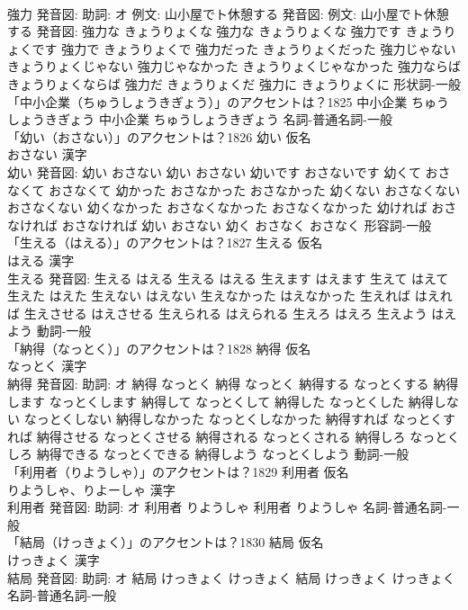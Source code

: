 \documentclass[8pt]{extreport}
\begin{document}
\begin{CJK}{UTF8}{min}
\\	強力 発音図: 助詞: オ 例文: 山小屋でト休憩する 発音図: 例文: 山小屋でト休憩する 発音図:	強力な きょうりょくな		強力な きょうりょくな 強力です きょうりょくです 強力で きょうりょくで 強力だった きょうりょくだった 強力じゃない きょうりょくじゃない 強力じゃなかった きょうりょくじゃなかった 強力ならば きょうりょくならば 強力だ きょうりょくだ 強力に きょうりょくに				形状詞-一般 
\\	「中小企業（ちゅうしょうきぎょう）」のアクセントは？1825		中小企業 ちゅうしょうきぎょう		中小企業 ちゅうしょうきぎょう				名詞-普通名詞-一般 
\\	「幼い（おさない）」のアクセントは？1826	幼い 仮名　
\\	おさない 漢字　
\\	幼い 発音図:	幼い おさない		幼い おさない 幼いです おさないです 幼くて おさなくて おさなくて 幼かった おさなかった おさなかった 幼くない おさなくない おさなくない 幼くなかった おさなくなかった おさなくなかった 幼ければ おさなければ おさなければ 幼い おさない 幼く おさなく おさなく				形容詞-一般 
\\	「生える（はえる）」のアクセントは？1827	生える 仮名　
\\	はえる 漢字　
\\	生える 発音図:	生える はえる		生える はえる 生えます はえます 生えて はえて 生えた はえた 生えない はえない 生えなかった はえなかった 生えれば はえれば 生えさせる はえさせる 生えられる はえられる 生えろ はえろ 生えよう はえよう				動詞-一般 
\\	「納得（なっとく）」のアクセントは？1828	納得 仮名　
\\	なっとく 漢字　
\\	納得 発音図: 助詞: オ	納得 なっとく		納得 なっとく 納得する なっとくする 納得します なっとくします 納得して なっとくして 納得した なっとくした 納得しない なっとくしない 納得しなかった なっとくしなかった 納得すれば なっとくすれば 納得させる なっとくさせる 納得される なっとくされる 納得しろ なっとくしろ 納得できる なっとくできる 納得しよう なっとくしよう				動詞-一般 
\\	「利用者（りようしゃ）」のアクセントは？1829	利用者 仮名　
\\	りようしゃ、りよーしゃ 漢字　
\\	利用者 発音図: 助詞: オ	利用者 りようしゃ		利用者 りようしゃ				名詞-普通名詞-一般 
\\	「結局（けっきょく）」のアクセントは？1830	結局 仮名　
\\	けっきょく 漢字　
\\	結局 発音図: 助詞: オ	結局 けっきょく けっきょく		結局 けっきょく けっきょく				名詞-普通名詞-一般 

\end{CJK}
\end{document}
